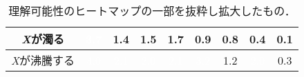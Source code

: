 \documentclass[12pt,usepdftitle=false]{beamer}
\begin{document}
\begin{frame}
\begin{table}[h]
\begin{tabular}{|c|c|c|c|c|c|c|c|c|}
        \hline
            \emph{X}が濁る & \cellcolor{sDarkRed}\textcolor{white}{3.7} & \cellcolor{sBlonde}1.4 & \cellcolor{sBlonde}1.5 & \cellcolor{sBlonde}1.7 & 0.9 & 0.8 & 0.4 & 0.1 \\
        \hline
            \emph{X}が沸騰する & \cellcolor{sDarkRed}\textcolor{white}{4.0} & \cellcolor{sOrange}\textcolor{white}{2.1} & \cellcolor{sOrange}\textcolor{white}{2.0} & \cellcolor{sOrange}\textcolor{white}{2.1} & \cellcolor{sDarkRed}\textcolor{white}{3.2} & \cellcolor{sBlonde}1.2 & \cellcolor{sOrange}\textcolor{white}{2.0} & 0.3 \\
        \hline
        \end{tabular}
        \caption{理解可能性のヒートマップの一部を抜粋し拡大したもの．}
    \end{table}
\end{frame}
\end{document}
